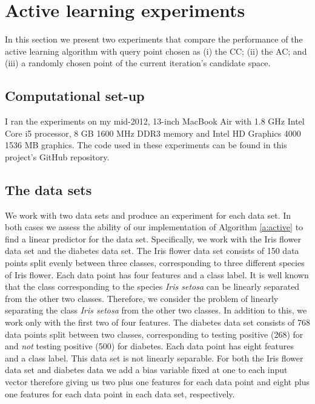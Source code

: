 \documentclass[11pt]{amsart}
\theoremstyle{definition}
\theoremstyle{remark}
\begin{document}
\section{Active learning experiments}
    In this section we present two experiments that compare the performance of the active learning algorithm with query point chosen as (i) the CC; (ii) the AC; and (iii) a randomly chosen point of the current iteration's candidate space. 

    \subsection*{Computational set-up} 
        I ran the experiments on my mid-2012, 13-inch MacBook Air with 1.8 GHz Intel Core i5 processor, 8 GB 1600 MHz DDR3 memory and Intel HD Graphics 4000 1536 MB graphics. The code used in these experiments can be found in this project's GitHub repository.

    \subsection*{The data sets} 
        We work with two data sets and produce an experiment for each data set. In both cases we assess the ability of our implementation of Algorithm \ref{a:active} to find a linear predictor for the data set. 
        Specifically, we work with the Iris flower data set and the diabetes data set. The Iris flower data set consists of 150 data points split evenly between three classes, corresponding to three different species of Iris flower. Each data point has four features and a class label. It is well known that the class corresponding to the species \emph{Iris setosa} can be linearly separated from the other two classes. Therefore, we consider the problem of linearly separating the class \emph{Iris setosa} from the other two classes. In addition to this, we work only with the first two of four features. The diabetes data set consists of 768 data points split between two classes, corresponding to testing positive (268) for  and \emph{not} testing positive (500) for diabetes. Each data point has eight features and a class label. This data set is not linearly separable. For both the Iris flower data set and diabetes data we add a bias variable fixed at one to each input vector therefore giving us two plus one features for each data point and eight plus one features for each data point in each data set, respectively.  
\end{document}
